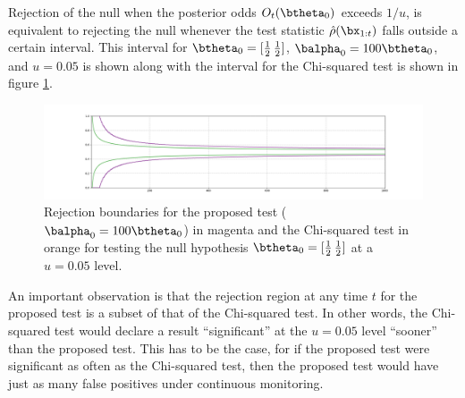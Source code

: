 \documentclass[11pt]{article}
\begin{document}
  Rejection of the null when the posterior odds $O_t(\btheta_0)$ exceeds $1/u$, is equivalent to rejecting the null whenever the test statistic $\hat{\rho}(\bx_{1:t})$ falls outside a certain interval.
This interval for $\btheta_0 = [\frac{1}{2}\, \frac{1}{2}]$, $\balpha_0 = 100\btheta_0 $, and $u=0.05$ is shown along with the interval for the Chi-squared test is shown in figure \ref{fig:critical}.
\begin{figure}[H]
  \centering
  \includegraphics[scale=0.35]{images/critical_regions.png}
  \caption{Rejection boundaries for the proposed test ($\balpha_0 = 100\btheta_0$) in magenta and the Chi-squared test in orange for testing the null hypothesis $\btheta_0 = [\frac{1}{2} \, \frac{1}{2}]$ at a $u=0.05$ level.
}
    \label{fig:critical}
  \end{figure}
  An important observation is that the rejection region at any time $t$ for the proposed test is a subset of that of the Chi-squared test.
In other words, the Chi-squared test would declare a result ``significant'' at the $u=0.05$ level ``sooner'' than the proposed test.
This has to be the case, for if the proposed test were significant as often as the Chi-squared test, then the proposed test would have just as many false positives under continuous monitoring.
  
\end{document}
